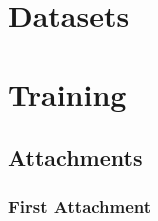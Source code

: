 \documentclass[12pt,a4paper]{report}
\let\openright=\clearpage
\begin{document}



\tableofcontents



\part{Datasets}


\part{Training}










\appendix
\chapter{Attachments}

\section{First Attachment}

\openright
\end{document}
